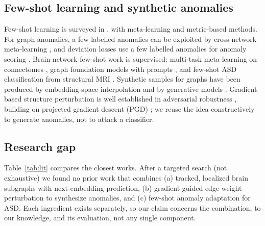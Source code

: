 \documentclass[conference]{IEEEtran}
\begin{document}
\subsection{Few-shot learning and synthetic anomalies}
Few-shot learning is surveyed in \cite{wang2021fewshot}, with meta-learning \cite{finn2017} and metric-based \cite{snell2017} methods. For graph anomalies, a few labelled anomalies can be exploited by cross-network meta-learning \cite{ding2021fewshot}, and deviation losses use a few labelled anomalies for anomaly scoring \cite{pang2019devnet}. Brain-network few-shot work is supervised: multi-task meta-learning on connectomes \cite{yang2022meta}, graph foundation models with prompts \cite{wei2025}, and few-shot ASD classification from structural MRI \cite{dhinagar2023}. Synthetic samples for graphs have been produced by embedding-space interpolation \cite{zhao2021smote} and by generative models \cite{chen2020gaan}. Gradient-based structure perturbation is well established in adversarial robustness \cite{zugner2018,dai2018,xu2019topology}, building on projected gradient descent (PGD) \cite{madry2018}; we reuse the idea constructively to generate anomalies, not to attack a classifier.

\subsection{Research gap}
Table~\ref{tab:lit} compares the closest works. After a targeted search (not exhaustive) we found no prior work that combines (a) tracked, localized brain subgraphs with next-embedding prediction, (b) gradient-guided edge-weight perturbation to synthesize anomalies, and (c) few-shot anomaly adaptation for ASD. Each ingredient exists separately, so our claim concerns the combination, to our knowledge, and its evaluation, not any single component.
\end{document}
